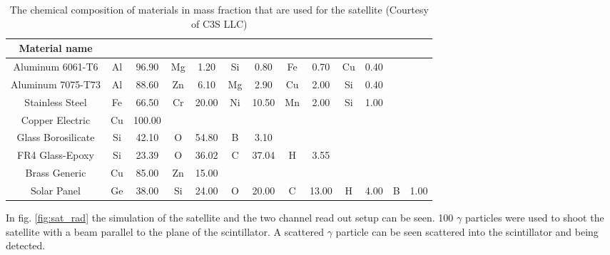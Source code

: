 \documentclass[12pt, a4paper,titlepage]{article}
\numberwithin{equation}{section}
\numberwithin{figure}{section}
\begin{document}
\begin{table}[h!]
\begin{center}
\begin{tabular}{ |c|c|c|c|c|c|c|c|c|c|c|c|c|} 
 \hline
Material name & &&&&&&&&&&& \\\hline
Aluminum 6061-T6 &	Al & 96.90 &	Mg &	1.20 &	Si &	0.80 &	Fe &	0.70 &	Cu &	0.40 & &\\\hline		
Aluminum 7075-T73 &	Al &	88.60 &	Zn &	6.10 &	Mg &	2.90 &	Cu &	2.00 &	Si &	0.40 & &\\\hline		
Stainless Steel &	Fe &	66.50 &	Cr &	20.00 &	Ni &	10.50	&Mn &	2.00 &	Si &	1.00 & &\\\hline		
Copper Electric  &Cu &	100.00 & & & & & & & & & &	\\\hline			
Glass Borosilicate &	Si &	42.10 &	O &	54.80 &	B &	3.10 & & & & & &\\\hline			
FR4 Glass-Epoxy &	Si &	23.39 &	O &	36.02 &	C &	37.04 &	H &	3.55 & & & &\\\hline		
Brass Generic &	Cu &	85.00 &	Zn &	15.00 & & & & & & & &\\\hline						
Solar Panel &	Ge &	38.00 &	Si &	24.00 &	O &	20.00 &	C &	13.00 &	H &	4.00 &	B &	1.00\\\hline
\end{tabular}
\end{center}
\caption{The chemical composition of materials in mass fraction that are used for the satellite (Courtesy of C3S LLC) \cite{drawing}}
\end{table}

\pagebreak

In fig. \ref{fig:sat_rad} the simulation of the satellite and the two channel read out setup can be seen. 100 $\gamma$ particles were used to shoot the satellite with a beam parallel to the plane of the scintillator. A scattered $\gamma$ particle can be seen scattered into the scintillator and being detected.
\end{document}
